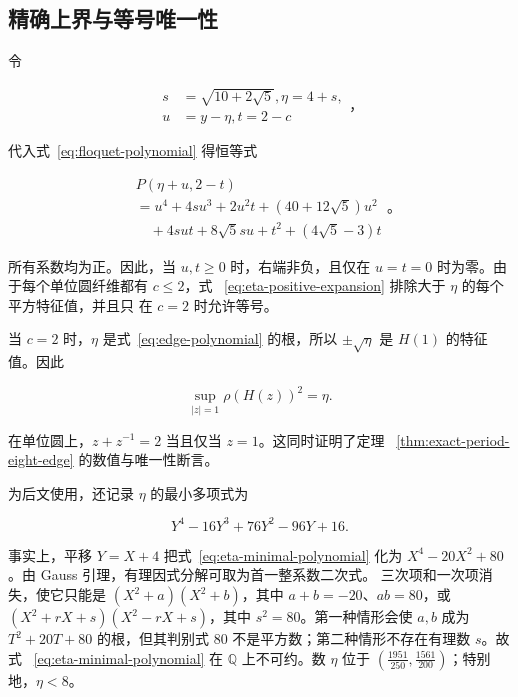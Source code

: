 \subsection{精确上界与等号唯一性}

令

\begin{equation}
\begin{aligned}
s&=\sqrt{10+2\sqrt{5}},       \eta=4+s, \\
u&=y-\eta,                   t=2-c
\end{aligned}
\text{，}
\end{equation}

代入式~\eqref{eq:floquet-polynomial} 得恒等式

\begin{equation}
\label{eq:eta-positive-expansion}
\begin{aligned}
&P(\eta+u,2-t) \\
&=u^{4}+4s u^{3}+2u^{2}t+(40+12\sqrt{5})u^{2} \\
&\quad +4s ut+8\sqrt{5}s u+t^{2}+(4\sqrt{5}-3)t
\end{aligned}
\text{。}
\end{equation}

所有系数均为正。因此，当 \(u,t\geq0\) 时，右端非负，且仅在 \(u=t=0\)
时为零。由于每个单位圆纤维都有 \(c\leq2\)，式~
\eqref{eq:eta-positive-expansion} 排除大于 \(\eta\) 的每个平方特征值，并且只
在 \(c=2\) 时允许等号。

当 \(c=2\) 时，\(\eta\) 是式~\eqref{eq:edge-polynomial} 的根，所以
\(\pm\sqrt\eta\) 是 \(H(1)\) 的特征值。因此

\begin{equation}
\label{eq:exact-infinite-edge}
\sup_{\lvert z\rvert=1} \rho(H(z))^{2}=\eta.
\end{equation}

在单位圆上，\(z+z^{-1}=2\) 当且仅当 \(z=1\)。这同时证明了定理~
\ref{thm:exact-period-eight-edge} 的数值与唯一性断言。

为后文使用，还记录 \(\eta\) 的最小多项式为

\begin{equation}
\label{eq:eta-minimal-polynomial}
Y^{4}-16Y^{3}+76Y^{2}-96Y+16.
\end{equation}

事实上，平移 \(Y=X+4\) 把式~\eqref{eq:eta-minimal-polynomial} 化为
\(X^4-20X^2+80\)。由 Gauss 引理，有理因式分解可取为首一整系数二次式。
三次项和一次项消失，使它只能是 \((X^2+a)(X^2+b)\)，其中
\(a+b=-20\)、\(ab=80\)，或 \((X^2+rX+s)(X^2-rX+s)\)，其中
\(s^2=80\)。第一种情形会使 \(a,b\) 成为 \(T^2+20T+80\) 的根，但其判别式
80 不是平方数；第二种情形不存在有理数 \(s\)。故式~
\eqref{eq:eta-minimal-polynomial} 在 \(\mathbb Q\) 上不可约。数 \(\eta\) 位于
\((\frac{1951}{250},\frac{1561}{200})\)；特别地，\(\eta<8\)。

